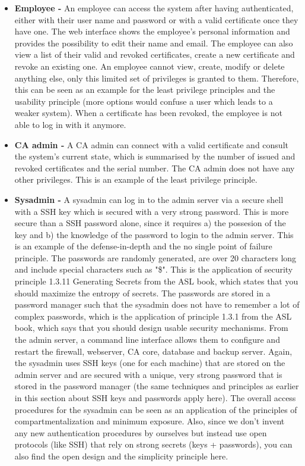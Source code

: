 \documentclass[english]{article}
\begin{document}
\begin{itemize}
  \item \textbf{Employee - } An employee can access the system after having authenticated, either with their user name and password or with a valid certificate once they have one. The web interface shows the employee's personal information and provides the possibility to edit their name and email. The employee can also view a list of their valid and revoked certificates, create a new certificate and revoke an existing one. An employee cannot view, create, modify or delete anything else, only this limited set of privileges is granted to them. Therefore, this can be seen as an example for the least privilege principles and the usability principle (more options would confuse a user which leads to a weaker system). When a certificate has been revoked, the employee is not able to log in with it anymore.
  \item \textbf{CA admin - } A CA admin can connect with a valid certificate and consult the system's current state, which is summarised by the number of issued and revoked certificates and the serial number. The CA admin does not have any other privileges. This is an example of the least privilege principle.
  \item \textbf{Sysadmin - } A sysadmin can log in to the admin server via a secure shell with a SSH key which is secured with a very strong password. This is more secure than a SSH password alone, since it requires a) the possesion of the key and b) the knowledge of the password to login to the admin server. This is an example of the defense-in-depth and the no single point of failure principle. The passwords are randomly generated, are over 20 characters long and include special characters such as "\$". This is the application of security principle 1.3.11 Generating Secrets from the ASL book, which states that you should maximize the entropy of secrets. The passwords are stored in a password manager such that the sysadmin does not have to remember a lot of complex passwords, which is the application of principle 1.3.1 from the ASL book, which says that you should design usable security mechanisms. From the admin server, a command line interface allows them to configure and restart the firewall, webserver, CA core, database and backup server. Again, the sysadmin uses SSH keys (one for each machine) that are stored on the admin server and are secured with a unique, very strong password that is stored in the password manager (the same techniques and principles as earlier in this section about SSH keys and passwords apply here). The overall access procedures for the sysadmin can be seen as an application of the principles of compartmentalization and minimum exposure. Also, since we don't invent any new authentication procedures by ourselves but instead use open protocols (like SSH) that rely on strong secrets (keys + passwords), you can also find the open design and the simplicity principle here.
\end{itemize}
\end{document}
